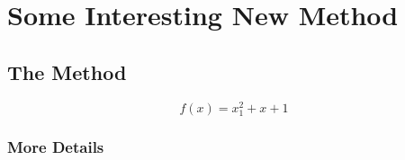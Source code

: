 \chapter{Some Interesting New Method}

\section{The Method}

\begin{equation}
\label{eq_the_method}
    f(x) = x_1^2 + x + 1
\end{equation}

\subsection{More Details}

\cite{dlib09,dedrick2006scope,henkel2006revealingemblinux,fitzgerald2003trencheslessons}
